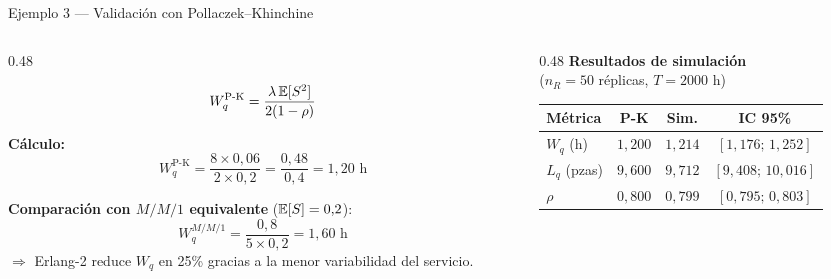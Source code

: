 \documentclass[aspectratio=1610, 10pt]{beamer}
\begin{document}
\begin{frame}{Ejemplo 3 — Validación con Pollaczek--Khinchine}
  \begin{columns}[T]
    \begin{column}{0.48\textwidth}
      \begin{formulabox}[P-K para $M/G/1$]
        \footnotesize
        \[
          W_q^{\text{P-K}} = \frac{\lambda\,\mathbb{E}[S^2]}{2(1-\rho)}
        \]
      \end{formulabox}

      \vspace{2pt}
      \footnotesize
      \textbf{Cálculo:}
      \[
        W_q^{\text{P-K}} = \frac{8\times 0{,}06}{2\times 0{,}2}
                         = \frac{0{,}48}{0{,}4}
                         = 1{,}20 \text{ h}
      \]

      \vspace{4pt}
      \textbf{Comparación con $M/M/1$ equivalente} ($\mathbb{E}[S]=0{,}2$):
      \[
        W_q^{M/M/1} = \frac{0{,}8}{5\times 0{,}2} = 1{,}60 \text{ h}
      \]
      $\Rightarrow$ Erlang-2 reduce $W_q$ en 25\% gracias a la
      menor variabilidad del servicio.
    \end{column}
    \begin{column}{0.48\textwidth}
      \footnotesize
      \textbf{Resultados de simulación}\\
      ($n_R=50$ réplicas, $T=2000$ h)
      \begin{center}\scriptsize
        \renewcommand{\arraystretch}{1.25}
        \begin{tabular}{lccc}
          \toprule
          \textbf{Métrica} & \textbf{P-K} & \textbf{Sim.} & \textbf{IC 95\%} \\
          \midrule
          $W_q$ (h)    & $1{,}200$ & $1{,}214$ & $[1{,}176;\,1{,}252]$ \\
          $L_q$ (pzas) & $9{,}600$ & $9{,}712$ & $[9{,}408;\,10{,}016]$ \\
          $\rho$       & $0{,}800$ & $0{,}799$ & $[0{,}795;\,0{,}803]$ \\
          \bottomrule
        \end{tabular}
      \end{center}

      \vspace{4pt}
    \end{column}
  \end{columns}


\end{frame}
\end{document}
